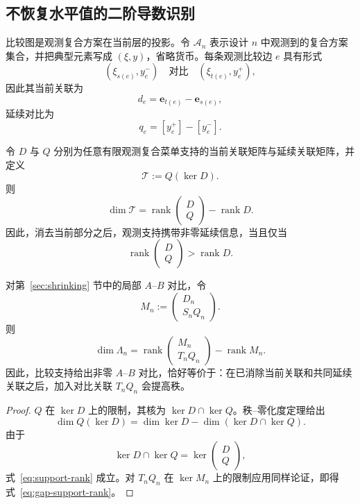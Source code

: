 \subsection{不恢复水平值的二阶导数识别}
\label{sec:derivatives-without-levels}

比较图是观测复合方案在当前层的投影。令 $\mathcal A_n$ 表示设计 $n$ 中观测到的复合方案集合，并把典型元素写成 $(\xi,y)$，省略货币。每条观测比较边 $e$ 具有形式
\[
(\xi_{s(e)},y_e^-)
\quad\text{对比}\quad
(\xi_{t(e)},y_e^+),
\]
因此其当前关联为
\[
d_e=\mathbf e_{t(e)}-\mathbf e_{s(e)},
\]
延续对比为
\[
q_e=[y_e^+]-[y_e^-].
\]

\begin{proposition}[延续像空间的维数]
\label{prop:support-rank}
令 $D$ 与 $Q$ 分别为任意有限观测复合菜单支持的当前关联矩阵与延续关联矩阵，并定义
\[
\mathcal T:=Q(\ker D).
\]
则
\begin{equation}
\boxed{
\dim \mathcal T
=
\operatorname{rank}
\begin{pmatrix}
D\\ Q
\end{pmatrix}
-
\operatorname{rank}D.}
\label{eq:support-rank}
\end{equation}
因此，消去当前部分之后，观测支持携带非零延续信息，当且仅当
\[
\operatorname{rank}
\begin{pmatrix}
D\\ Q
\end{pmatrix}
>
\operatorname{rank}D.
\]

对第~\ref{sec:shrinking} 节中的局部 $A$--$B$ 对比，令
\[
M_n:=
\begin{pmatrix}
D_n\\ S_nQ_n
\end{pmatrix}.
\]
则
\begin{equation}
\boxed{
\dim\Lambda_n
=
\operatorname{rank}
\begin{pmatrix}
M_n\\ T_nQ_n
\end{pmatrix}
-
\operatorname{rank}M_n.}
\label{eq:gap-support-rank}
\end{equation}
因此，比较支持给出非零 $A$--$B$ 对比，恰好等价于：在已消除当前关联和共同延续关联之后，加入对比关联 $T_nQ_n$ 会提高秩。
\end{proposition}

\begin{proof}
$Q$ 在 $\ker D$ 上的限制，其核为 $\ker D\cap\ker Q$。秩--零化度定理给出
\[
\dim Q(\ker D)
=
\dim\ker D-
\dim(\ker D\cap\ker Q).
\]
由于
\[
\ker D\cap\ker Q
=
\ker
\begin{pmatrix}
D\\ Q
\end{pmatrix},
\]
式~\eqref{eq:support-rank} 成立。对 $T_nQ_n$ 在 $\ker M_n$ 上的限制应用同样论证，即得式~\eqref{eq:gap-support-rank}。
\end{proof}


